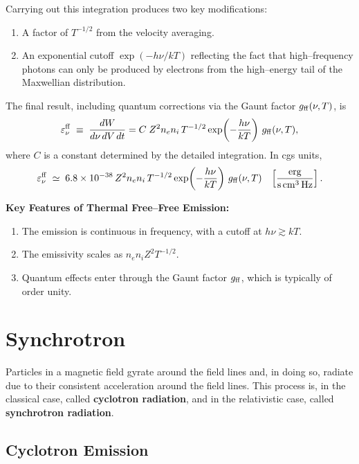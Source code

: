Carrying out this integration produces two key modifications:
\begin{enumerate}
    \item A factor of $T^{-1/2}$ from the velocity averaging.
    \item An exponential cutoff $\exp(-h\nu/kT)$ reflecting the fact
          that high--frequency photons can only be produced by electrons
          from the high--energy tail of the Maxwellian distribution.
\end{enumerate}
The final result, including quantum corrections via the Gaunt factor
$g_{\rm ff}(\nu,T)$, is
\begin{equation}
    \varepsilon_\nu^{\rm ff}
    \;\equiv\; \frac{dW}{d\nu\, dV\, dt}
    = C \; Z^2 n_e n_i \, T^{-1/2}
      \exp\!\left(-\frac{h\nu}{kT}\right)\,
      g_{\rm ff}(\nu,T),
\end{equation}
where $C$ is a constant determined by the detailed integration. In cgs
units,
\[
    \varepsilon_\nu^{\rm ff}
    \;\simeq\;
    6.8 \times 10^{-38}
    \, Z^2 n_e n_i \, T^{-1/2}
    \exp\!\left(-\frac{h\nu}{kT}\right)\,
    g_{\rm ff}(\nu,T)
    \;\;\; \left[\frac{\rm erg}{\rm s \, cm^3 \, Hz}\right].
\]

\begin{remark}
    \textbf{Key Features of Thermal Free--Free Emission:}
    \begin{enumerate}
        \item The emission is continuous in frequency, with a cutoff at
              $h\nu \gtrsim kT$.
        \item The emissivity scales as $n_e n_i Z^2 T^{-1/2}$.
        \item Quantum effects enter through the Gaunt factor
              $g_{\rm ff}$, which is typically of order unity.
    \end{enumerate}
\end{remark}

\section{Synchrotron}

Particles in a magnetic field gyrate around the field lines and, in doing so, radiate due to their consistent acceleration around the field lines. This process is, in the classical case, called \textbf{cyclotron radiation}, and in the relativistic case, called \textbf{synchrotron radiation}. 

\subsection{Cyclotron Emission}

